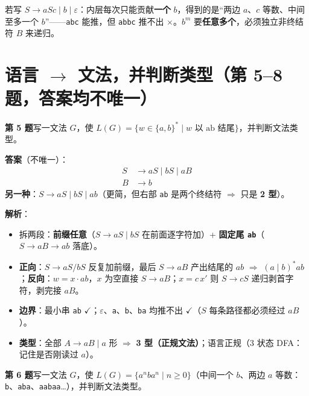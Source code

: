 \documentclass[12pt,a4paper,fontset=windows]{ctexart}
\newcommand{\ok}{\ensuremath{\checkmark}}
\newcommand{\bad}{\ensuremath{\times}}
\newcommand{\imp}{\ensuremath{\Rightarrow}}
\begin{document}
\begin{warnbox}[出口不能图省事]
若写 $S \to aSc \mid b \mid \varepsilon$：内层每次只能贡献\textbf{一个} $b$，得到的是``两边 $a$、$c$ 等数、中间至多一个 $b$''——\texttt{abc} 能推，但 \texttt{abbc} 推不出 \bad。$b^m$ 要\textbf{任意多个}，必须独立非终结符 $B$ 来递归。
\end{warnbox}

\section{\texorpdfstring{语言 $\to$ 文法，并判断类型（第 5--8 题，答案均不唯一）}{语言→文法，并判断类型（第 5–8 题，答案均不唯一）}}

\begin{qbox}
{\large\bfseries 第 5 题}\quad 写一文法 $G$，使 $L(G)=\{w \in \{a,b\}^* \mid w \text{ 以 ab 结尾}\}$，并判断文法类型。
\end{qbox}

\textbf{答案}（不唯一）：
\[
\begin{aligned}
S &\to aS \mid bS \mid aB\\
B &\to b
\end{aligned}
\]
\textbf{另一种}：$S \to aS \mid bS \mid ab$（更简，但右部 \texttt{ab} 是两个终结符 \imp{} 只是 \textbf{2 型}）。

\textbf{解析}：
\begin{itemize}
\item 拆两段：\textbf{前缀任意}（$S \to aS \mid bS$ 在前面逐字符加）+ \textbf{固定尾 \texttt{ab}}（$S \to aB \to ab$ 落底）。
\item \textbf{正向}：$S \to aS/bS$ 反复加前缀，最后 $S \to aB$ 产出结尾的 $ab$ \imp{} $(a \mid b)^* ab$；\textbf{反向}：$w = x \cdot ab$，$x$ 为空直接 $S \to aB$；$x = c\, x'$ 则 $S \to cS$ 递归剥首字符，剥完接 $aB$。
\item \textbf{边界}：最小串 \texttt{ab} \ok；$\varepsilon$、\texttt{a}、\texttt{b}、\texttt{ba} 均推不出 \ok（$S$ 每条路径都必须经过 $aB$）。
\item \textbf{类型}：全部 $A \to aB \mid a$ 形 \imp{} \textbf{3 型（正规文法）}；语言正规（3 状态 DFA：记住是否刚读过 $a$）。
\end{itemize}

\begin{qbox}
{\large\bfseries 第 6 题}\quad 写一文法 $G$，使 $L(G)=\{a^n b a^n \mid n \ge 0\}$（中间一个 $b$、两边 $a$ 等数：\texttt{b}、\texttt{aba}、\texttt{aabaa}…），并判断文法类型。
\end{qbox}
\end{document}
